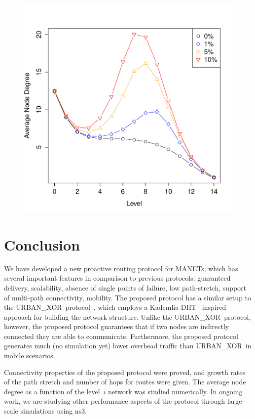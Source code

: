 \documentclass[conference]{IEEEtran}
\theoremstyle{definition}
\newcommand{\urbanxor}{URBAN\_XOR}
\begin{document}
\begin{figure}[H]
    \includegraphics[width=0.95\linewidth]{degrees}

    \label{fig:degrees}
\end{figure}


\section{Conclusion}
\label{sec:conclusion}

We have developed a new proactive routing protocol for MANETs, which has several important features in comparison to previous protocols: guaranteed delivery, scalability, absence of single points of failure, low path-stretch, support of multi-path connectivity, {\color{orange}mobility}. The proposed protocol has a similar setup to the \urbanxor\ protocol~\cite{Pasquini}, which employs a Kademlia DHT~\cite{kademlia} inspired approach for building the network structure. Unlike the \urbanxor\ protocol, however, the proposed protocol guarantees that if two nodes are indirectly connected they are able to communicate. Furthermore, the proposed protocol generates {\color{orange}much (no simulation yet)} lower overhead traffic than \urbanxor\ in mobile scenarios.  

Connectivity properties of the proposed protocol were proved, and growth rates of the path stretch and number of hops for routes were given. The average node degree as a function of the level~$i$ network was studied numerically. In ongoing work, we are studying other performance aspects of the protocol through large-scale simulations {\color{orange}using ns3}.




\end{document}
